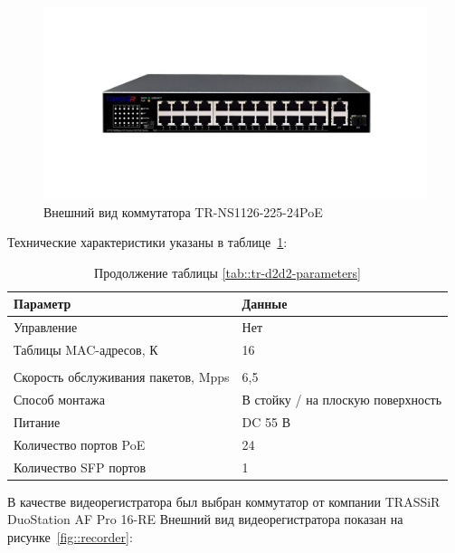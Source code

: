 \begin{figure}[h]
    \begin{center}
        \includegraphics[width=120mm]{images/TR-NS1126-225-24PoE}
    \end{center}
    \captionsetup{justification=centering}
    \caption{Внешний вид коммутатора TR-NS1126-225-24PoE}
    \label{fig::TR-NS1126-225-24PoE}
\end{figure}

Технические характеристики указаны в таблице~\ref{tab::TR-NS1126-225-24PoE-parameters}:
\begin{longtable}{|p{5cm}|p{12cm}|}
    \caption{Технические характеристики коммутатора ЕR-NS1126-225-24PoE}
    \label{tab::TR-NS1126-225-24PoE-parameters} \\

    \hline
    Параметр &
    Данные \\
    \hline
    Управление &
    Нет \\
    \hline
    Таблицы MAC-адресов, К &
    16 \\
    \hline
    \endfirsthead
    \newpage
    \caption*{Продолжение таблицы \ref{tab::tr-d2d2-parameters}}\\
    \hline
    Скорость обслуживания пакетов, Mpps &
    6,5 \\
    \hline
    Способ монтажа &
    В стойку / на плоскую поверхность \\
    \hline
    Питание &
    DC 55 В \\
    \hline
    Количество портов PoE &
    24 \\
    \hline
    Количество SFP портов &
    1 \\
    \hline
\end{longtable}

\newpage

В качестве видеорегистратора был выбран коммутатор от компании TRASSiR DuoStation AF Pro 16-RE
Внешний вид видеорегистратора показан на рисунке~\ref{fig::recorder}:

